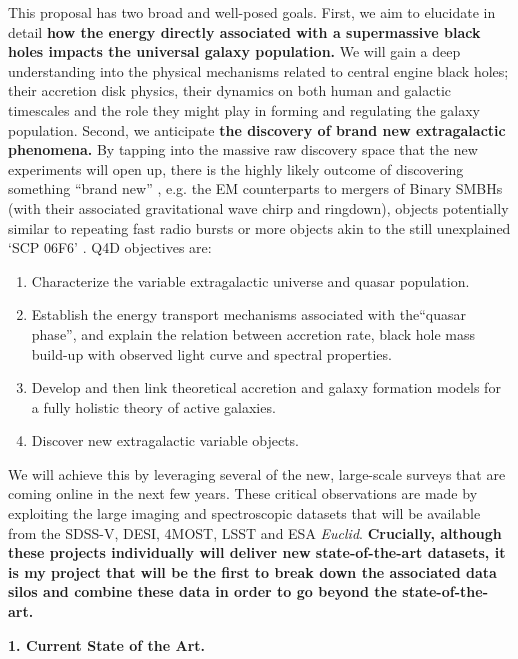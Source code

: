 \documentclass[oneside, a4paper, onecolumn, 11pt]{article}
\begin{document}
\smallskip
\smallskip
\noindent
This proposal has two broad and well-posed goals. First, we aim to
elucidate in detail {\bf how the energy directly associated with a
supermassive black holes impacts the universal galaxy population.} We
will gain a deep understanding into the physical mechanisms related to
central engine black holes; their accretion disk physics, their
dynamics on both human and galactic timescales and the role they might
play in forming and regulating the galaxy population.
Second, we anticipate {\bf the discovery of brand new extragalactic
phenomena.}  By tapping into the massive raw discovery space that
the new experiments will open up, there is the highly likely outcome
of discovering something ``brand new'' \citep{Ivezic2008,
LSST_ScienceBook}, e.g. the EM counterparts to mergers of Binary SMBHs
(with their associated gravitational wave chirp and ringdown),
objects potentially similar to repeating fast radio bursts \citet{Spitler2016} 
or more objects akin to the still
unexplained `SCP 06F6' \citep{Barbary2009}.
Q4D objectives are:
\begin{enumerate}
\item Characterize the variable extragalactic universe and quasar population. 
\item Establish the energy transport mechanisms associated with the``quasar phase'', and explain the relation between accretion rate, black hole mass build-up with observed light curve and spectral properties. 
\item Develop and then link theoretical accretion and galaxy formation models for a fully holistic theory of active galaxies. 
\item Discover new extragalactic variable objects. 
\end{enumerate}

\smallskip
\smallskip
\noindent
We will achieve this by leveraging several of the new, large-scale
surveys that are coming online in the next few years. These critical
observations are made by exploiting the large imaging and
spectroscopic datasets that will be available from the SDSS-V, DESI,
4MOST, LSST and ESA {\it Euclid}. {\bf Crucially, although these
projects individually will deliver new state-of-the-art datasets, it
is my project that will be the first to break down the associated
data silos and combine these data in order to go beyond the
state-of-the-art.}


\medskip
\medskip
\noindent
\large
{\bf{\textcolor{Cerulean}{1. Current State of the Art.}}}
\normalsize
\end{document}
